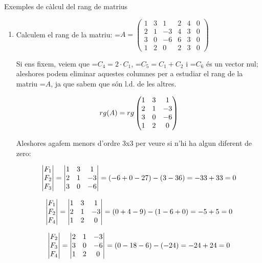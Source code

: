 \documentclass[11pt,a4paper]{article}
\newcommand{\fmm}[1]{\setbox0=\hbox{$#1$}\ifdim\wd0>\linewidth\fmdisp{#1}\else\mbox{\box0}\fi}
\newcommand{\fmdisp}[1]{\[\setbox2=\hbox{$\displaystyle #1$}\ifdim\wd2>\linewidth\resizebox{\linewidth}{!}{\box2}\else\box2\fi\]}
\begin{document}
\begin{fmex}{Exemples de càlcul del rang de matrius}
\begin{enumerate}[label=\textbf{\arabic*.},leftmargin=*]
\fmm{\rightarrow} els tres vectors són l.i.
\item Calculem el rang de la matriu: \fmm{A=\begin{pmatrix}1 & 3 & 1 & 2 & 4 & 0\\ 2 & 1 & -3 & 4 & 3 & 0\\ 3 & 0 & -6 & 6 & 3 & 0\\ 1 & 2 & 0 & 2 & 3 & 0\end{pmatrix}}

Si ens fixem, veiem que \fmm{C_4=2\cdot C_1}, \fmm{C_5=C_1+C_2} i \fmm{C_6} és un vector nul; aleshores podem eliminar aquestes columnes per a estudiar el rang de la matriu \fmm{A}, ja que sabem que són l.d. de les altres.

\fmdisp{rg(A)=rg\begin{pmatrix}1 & 3 & 1\\ 2 & 1 & -3\\ 3 & 0 & -6\\ 1 & 2 & 0\end{pmatrix}}

Aleshores agafem menors d'ordre 3x3 per veure si n'hi ha algun diferent de zero:

\fmdisp{\begin{vmatrix}F_1\\ F_2\\ F_3\end{vmatrix}=\begin{vmatrix}1 & 3 & 1\\ 2 & 1 & -3\\ 3 & 0 & -6\end{vmatrix}=(-6+0-27)-(3-36)=-33+33=0}

\fmdisp{\begin{vmatrix}F_1\\ F_2\\ F_4\end{vmatrix}=\begin{vmatrix}1 & 3 & 1\\ 2 & 1 & -3\\ 1 & 2 & 0\end{vmatrix}=(0+4-9)-(1-6+0)=-5+5=0}

\fmdisp{\begin{vmatrix}F_2\\ F_3\\ F_4\end{vmatrix}=\begin{vmatrix}2 & 1 & -3\\ 3 & 0 & -6\\ 1 & 2 & 0\end{vmatrix}=(0-18-6)-(-24)=-24+24=0}


\end{enumerate}
\end{fmex}
\end{document}
